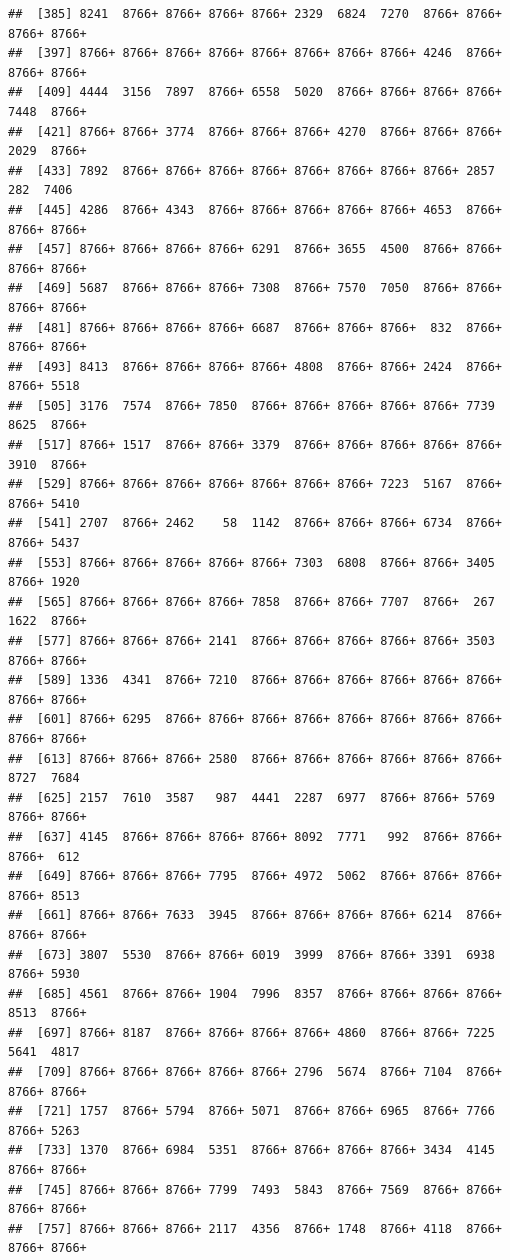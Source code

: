 \documentclass[
]{book}
\begin{document}
\begin{verbatim}
##  [385] 8241  8766+ 8766+ 8766+ 8766+ 2329  6824  7270  8766+ 8766+ 8766+ 8766+
##  [397] 8766+ 8766+ 8766+ 8766+ 8766+ 8766+ 8766+ 8766+ 4246  8766+ 8766+ 8766+
##  [409] 4444  3156  7897  8766+ 6558  5020  8766+ 8766+ 8766+ 8766+ 7448  8766+
##  [421] 8766+ 8766+ 3774  8766+ 8766+ 8766+ 4270  8766+ 8766+ 8766+ 2029  8766+
##  [433] 7892  8766+ 8766+ 8766+ 8766+ 8766+ 8766+ 8766+ 8766+ 2857   282  7406 
##  [445] 4286  8766+ 4343  8766+ 8766+ 8766+ 8766+ 8766+ 4653  8766+ 8766+ 8766+
##  [457] 8766+ 8766+ 8766+ 8766+ 6291  8766+ 3655  4500  8766+ 8766+ 8766+ 8766+
##  [469] 5687  8766+ 8766+ 8766+ 7308  8766+ 7570  7050  8766+ 8766+ 8766+ 8766+
##  [481] 8766+ 8766+ 8766+ 8766+ 6687  8766+ 8766+ 8766+  832  8766+ 8766+ 8766+
##  [493] 8413  8766+ 8766+ 8766+ 8766+ 4808  8766+ 8766+ 2424  8766+ 8766+ 5518 
##  [505] 3176  7574  8766+ 7850  8766+ 8766+ 8766+ 8766+ 8766+ 7739  8625  8766+
##  [517] 8766+ 1517  8766+ 8766+ 3379  8766+ 8766+ 8766+ 8766+ 8766+ 3910  8766+
##  [529] 8766+ 8766+ 8766+ 8766+ 8766+ 8766+ 8766+ 7223  5167  8766+ 8766+ 5410 
##  [541] 2707  8766+ 2462    58  1142  8766+ 8766+ 8766+ 6734  8766+ 8766+ 5437 
##  [553] 8766+ 8766+ 8766+ 8766+ 8766+ 7303  6808  8766+ 8766+ 3405  8766+ 1920 
##  [565] 8766+ 8766+ 8766+ 8766+ 7858  8766+ 8766+ 7707  8766+  267  1622  8766+
##  [577] 8766+ 8766+ 8766+ 2141  8766+ 8766+ 8766+ 8766+ 8766+ 3503  8766+ 8766+
##  [589] 1336  4341  8766+ 7210  8766+ 8766+ 8766+ 8766+ 8766+ 8766+ 8766+ 8766+
##  [601] 8766+ 6295  8766+ 8766+ 8766+ 8766+ 8766+ 8766+ 8766+ 8766+ 8766+ 8766+
##  [613] 8766+ 8766+ 8766+ 2580  8766+ 8766+ 8766+ 8766+ 8766+ 8766+ 8727  7684 
##  [625] 2157  7610  3587   987  4441  2287  6977  8766+ 8766+ 5769  8766+ 8766+
##  [637] 4145  8766+ 8766+ 8766+ 8766+ 8092  7771   992  8766+ 8766+ 8766+  612 
##  [649] 8766+ 8766+ 8766+ 7795  8766+ 4972  5062  8766+ 8766+ 8766+ 8766+ 8513 
##  [661] 8766+ 8766+ 7633  3945  8766+ 8766+ 8766+ 8766+ 6214  8766+ 8766+ 8766+
##  [673] 3807  5530  8766+ 8766+ 6019  3999  8766+ 8766+ 3391  6938  8766+ 5930 
##  [685] 4561  8766+ 8766+ 1904  7996  8357  8766+ 8766+ 8766+ 8766+ 8513  8766+
##  [697] 8766+ 8187  8766+ 8766+ 8766+ 8766+ 4860  8766+ 8766+ 7225  5641  4817 
##  [709] 8766+ 8766+ 8766+ 8766+ 8766+ 2796  5674  8766+ 7104  8766+ 8766+ 8766+
##  [721] 1757  8766+ 5794  8766+ 5071  8766+ 8766+ 6965  8766+ 7766  8766+ 5263 
##  [733] 1370  8766+ 6984  5351  8766+ 8766+ 8766+ 8766+ 3434  4145  8766+ 8766+
##  [745] 8766+ 8766+ 8766+ 7799  7493  5843  8766+ 7569  8766+ 8766+ 8766+ 8766+
##  [757] 8766+ 8766+ 8766+ 2117  4356  8766+ 1748  8766+ 4118  8766+ 8766+ 8766+

\end{verbatim}
\end{document}
